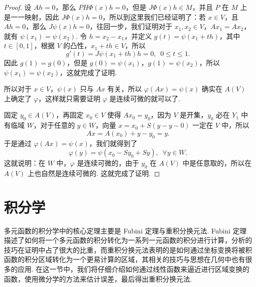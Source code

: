 \begin{proof}
    设 $Ah = 0$，那么 $PH\Phi(x)h = 0$，但是 $J\Phi(x)h \in M$，并且 $P$ 在 $M$ 上是一一映射，因此 $J\Phi(x)h = 0$，所以到这里我们已经证明了：若 $x\in V$，且 $Ah = 0$，那么 $J\psi(x)h = 0$，往回一步，我们证明对于 $x_1, x_2\in V$，$Ax_1 = Ax_2$，就有 $\psi(x_1) = \psi(x_2)$. 令 $h = x_2 - x_1$，并定义 $g(t) = \psi(x_1 + th)$，其中 $t\in [0, 1]$，根据 $V$ 的凸性，$x_1 + th\in V$，所以 \[g'(t) = J\psi(x_1 + th)h = 0, \enspace 0 \leqslant t\leqslant 1.\]
    因此 $g(1) = g(0)$，但是 $g(0) = \psi(x_1)$，$g(1) = \psi(x_2)$，所以 $\psi(x_1) = \psi(x_2)$，这就完成了证明.

    所以对于 $x\in V$，$\psi(x)$ 只与 $Ax$ 有关，所以 $\varphi(Ax) = \psi(x)$ 确实在 $A(V)$ 上确定了 $\varphi$，这样就只需要证明 $\varphi$ 是连续可微的就可以了.

    固定 $y_0\in A(V)$，再固定 $x_0\in V$ 使得 $Ax_0 = y_0$，因为 $V$ 是开集，$y_0$ 必在 $Y_1$ 中有临域 $W$，对于任意的 $y\in W$，向量 $x = x_0 + S(y - y-0)$ 一定在 $V$ 中，所以 \[Ax = A(x_0) + y - y_0 = y.\]
    于是通过 $\varphi(Ax) = \psi(x)$，我们就得到了 \[\varphi(y) = \psi(x_0 - Sy_0 + Sy), \enspace \forall y\in W.\]
    这就说明：在 $W$ 中，$\varphi$ 是连续可微的，由于 $y_0$ 在 $A(V)$ 中是任意取的，所以在 $A(V)$ 上也自然是连续可微的. 这就完成了证明.
\end{proof}

\section{积分学}

多元函数的积分学中的核心定理主要是 Fubini 定理与重积分换元法. Fubini 定理描述了如何将一个多元函数的积分转化为一系列一元函数的积分进行计算，分析的技巧在证明中占了很大的比重，而重积分换元法表明的是如何通过坐标变换将被积函数的积分区域转化为一个更易计算的区域，其相关的技巧与思想在几何中也有很多的应用. 在这一节中，我们将仔细介绍如何通过线性函数来逼近进行区域变换的函数，使用微分学的方法来估计误差，最后得出重积分换元法.


